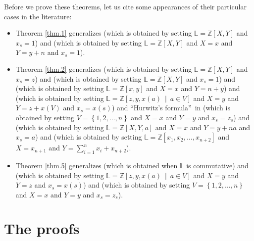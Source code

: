 \documentclass[numbers=enddot,12pt,final,onecolumn,notitlepage]{scrartcl}%
\theoremstyle{definition}
\let\sumnonlimits\sum
\renewcommand{\sum}{\sumnonlimits\limits}
\begin{document}
Before we prove these theorems, let us cite some appearances of their
particular cases in the literature:

\begin{itemize}
\item Theorem \ref{thm.1} generalizes \cite[Problem 4]{qedmo09} (which is
obtained by setting $\mathbb{L}=\mathbb{Z}\left[  X,Y\right]  $ and $x_{s}=1$)
and \cite[\S 1.5, Cauchy's identity]{Riorda68} (which is obtained by setting
$\mathbb{L}=\mathbb{Z}\left[  X,Y\right]  $ and $X=x$ and $Y=y+n$ and
$x_{s}=1$).

\item Theorem \ref{thm.2} generalizes \cite[Chapter III, Theorem B]{Comtet74}
(which is obtained by setting $\mathbb{L}=\mathbb{Z}\left[  X,Y\right]  $ and
$x_{s}=z$) and \cite[Theorem 4]{qedmo09} (which is obtained by setting
$\mathbb{L}=\mathbb{Z}\left[  X,Y\right]  $ and $x_{s}=1$) and \cite[(11)]%
{Kalai79} (which is obtained by setting $\mathbb{L}=\mathbb{Z}\left[
x,y\right]  $ and $X=x$ and $Y=n+y$) and \cite[1.3]{KelPos} (which is obtained
by setting $\mathbb{L}=\mathbb{Z}\left[  z,y,x\left(  a\right)  \ \mid\ a\in
V\right]  $ and $X=y$ and $Y=z+x\left(  V\right)  $ and $x_{s}=x\left(
s\right)  $) and \textquotedblleft Hurwitz's formula\textquotedblright\ in
\cite[solution to Section 1.2.6, Exercise 51]{Knuth97} (which is obtained by
setting $V=\left\{  1,2,\ldots,n\right\}  $ and $X=x$ and $Y=y$ and
$x_{s}=z_{s}$) and \cite[\S 1.5, (13)]{Riorda68} (which is obtained by setting
$\mathbb{L}=\mathbb{Z}\left[  X,Y,a\right]  $ and $X=x$ and $Y=y+na$ and
$x_{s}=a$) and \cite[Exercise 5.31 \textbf{b}]{Stanley-EC2} (which is obtained
by setting $\mathbb{L}=\mathbb{Z}\left[  x_{1},x_{2},\ldots,x_{n+2}\right]  $
and $X=x_{n+1}$ and $Y=\sum_{i=1}^{n}x_{i}+x_{n+2}$).

\item Theorem \ref{thm.5} generalizes \cite[Chapter III, Exercise
20]{Comtet74} (which is obtained when $\mathbb{L}$ is commutative) and
\cite[1.2]{KelPos} (which is obtained by setting $\mathbb{L}=\mathbb{Z}\left[
z,y,x\left(  a\right)  \ \mid\ a\in V\right]  $ and $X=y$ and $Y=z$ and
$x_{s}=x\left(  s\right)  $) and \cite[Section 2.3.4.4, Exercise 30]{Knuth97}
(which is obtained by setting $V=\left\{  1,2,\ldots,n\right\}  $ and $X=x$
and $Y=y$ and $x_{s}=z_{s}$).
\end{itemize}


\section{The proofs}
\end{document}
